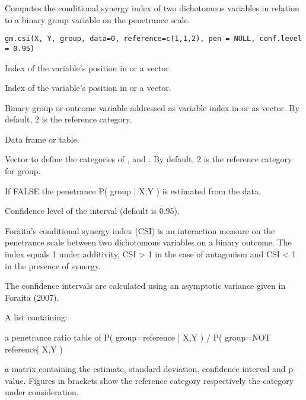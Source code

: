 \begin{Description}\relax
Computes the conditional synergy index of two dichotomous variables in relation to 
a binary group variable on the penetrance scale.
\end{Description}
\begin{Usage}
\begin{verbatim}
gm.csi(X, Y, group, data=0, reference=c(1,1,2), pen = NULL, conf.level = 0.95)
\end{verbatim}
\end{Usage}
\begin{Arguments}
\begin{ldescription}
\item[\code{X}] Index of the variable's position in  or a vector. 
\item[\code{Y}] Index of the variable's position in  or a vector. 
\item[\code{group}] Binary group or outcome variable addressed as variable index in 
 or as vector. By default, 2 is the reference category.
\item[\code{data}] Data frame or table. 
\item[\code{reference}] Vector to define the  categories of ,  and . 
By default, 2 is the reference category for group.
\item[\code{pen}] If FALSE the penetrance P( group | X,Y ) is estimated from the data. 
\item[\code{conf.level}] Confidence level of the interval (default is 0.95). 
\end{ldescription}
\end{Arguments}
\begin{Details}\relax
Foraita's conditional synergy index (CSI) is an interaction measure on the penetrance scale
between two dichotomous variables on a  binary outcome. 
The index equals 1 under additivity, CSI > 1 in the case of antagonism and 
CSI < 1 in the presence of synergy.

The confidence intervals are calculated using an asymptotic variance given in Foraita (2007).
\end{Details}
\begin{Value}
A list containing:
\begin{ldescription}
\item[\code{penetrance.ratio}] a penetrance ratio table of P( group=reference | X,Y ) / P( group=NOT reference| X,Y ) 
\item[\code{measure}] a matrix containing the estimate, standard deviation, 
confidence interval and p-value. Figures in brackets show the
reference category respectively the category under consideration.
\end{ldescription}
\end{Value}
